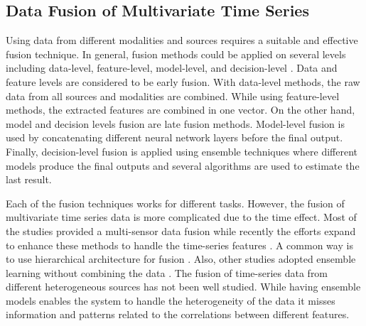 \documentclass[conference]{IEEEtran}
\begin{document}
\subsection{Data Fusion of Multivariate Time Series}
Using data from different modalities and sources requires a suitable and effective fusion technique. In general, fusion methods could be applied on several levels including data-level, feature-level, model-level, and decision-level \cite{wu2018sensor}. Data and feature levels are considered to be early fusion. With data-level methods, the raw data from all sources and modalities are combined. While using feature-level methods, the extracted features are combined in one vector. On the other hand, model and decision levels fusion are late fusion methods. Model-level fusion is used by concatenating different neural network layers before the final output. Finally, decision-level fusion is applied using ensemble techniques where different models produce the final outputs and several algorithms are used to estimate the last result.

Each of the fusion techniques works for different tasks. However, the fusion of multivariate time series data is more complicated due to the time effect. Most of the studies provided a multi-sensor data fusion \cite{mitchell2007multi,brena2020choosing} while recently the efforts expand to enhance these methods to handle the time-series features \cite{diao2019data,zhu2019improvement,diao2017data}. A common way is to use hierarchical architecture for fusion \cite{harris1998multi}. Also, other studies adopted ensemble learning without combining the data \cite{wu2018sensor}. The fusion of time-series data from different heterogeneous sources has not been well studied. While having ensemble models enables the system to handle the heterogeneity of the data it misses information and patterns related to the correlations between different features.
\end{document}
